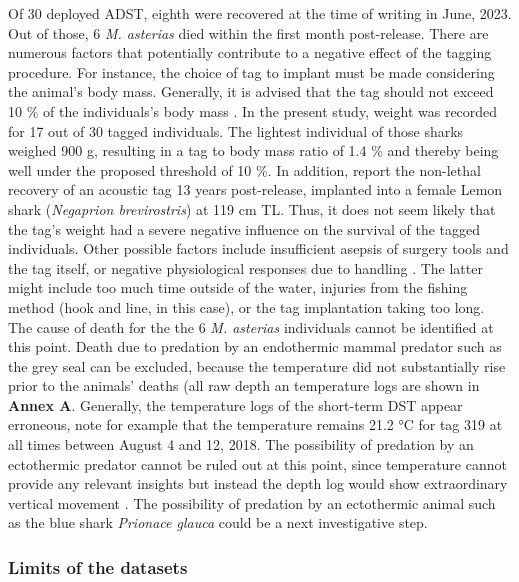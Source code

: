 \documentclass[
  authoryear,
  review,
  3p]{elsarticle}
\begin{document}
Of 30 deployed ADST, eighth were recovered at the time of writing in
June, 2023. Out of those, 6 \emph{M. asterias} died within the first
month post-release. There are numerous factors that potentially
contribute to a negative effect of the tagging procedure. For instance,
the choice of tag to implant must be made considering the animal's body
mass. Generally, it is advised that the tag should not exceed 10 \% of
the individuals's body mass \citep{wagner_2011}. In the present study,
weight was recorded for 17 out of 30 tagged individuals. The lightest
individual of those sharks weighed 900 g, resulting in a tag to body
mass ratio of 1.4 \% and thereby being well under the proposed threshold
of 10 \%. In addition, \citet{smukall_2019} report the non-lethal
recovery of an acoustic tag 13 years post-release, implanted into a
female Lemon shark (\emph{Negaprion brevirostris}) at 119 cm TL. Thus,
it does not seem likely that the tag's weight had a severe negative
influence on the survival of the tagged individuals. Other possible
factors include insufficient asepsis of surgery tools and the tag
itself, or negative physiological responses due to handling
\citep{rub_2014}. The latter might include too much time outside of the
water, injuries from the fishing method (hook and line, in this case),
or the tag implantation taking too long. The cause of death for the the
6 \emph{M. asterias} individuals cannot be identified at this point.
Death due to predation by an endothermic mammal predator such as the
grey seal can be excluded, because the temperature did not substantially
rise \citep[to around 38 °C,][]{austin_2006} prior to the animals'
deaths (all raw depth an temperature logs are shown in \textbf{Annex A}.
Generally, the temperature logs of the short-term DST appear erroneous,
note for example that the temperature remains 21.2 °C for tag 319 at all
times between August 4 and 12, 2018. The possibility of predation by an
ectothermic predator cannot be ruled out at this point, since
temperature cannot provide any relevant insights but instead the depth
log would show extraordinary vertical movement \citep[see][ for examples
of predation by endothermic versus ectothermic predators]{seitz_2019}.
The possibility of predation by an ectothermic animal such as the blue
shark \emph{Prionace glauca} could be a next investigative step.

\hypertarget{sec-disc-datasetlimits}{%
\subsubsection{Limits of the datasets}\label{sec-disc-datasetlimits}}
\end{document}
